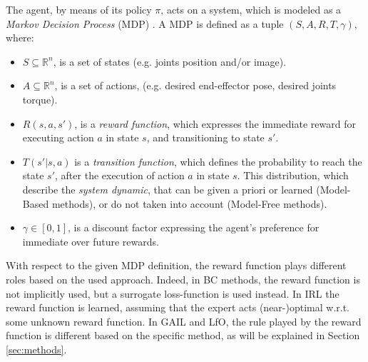 \newline The agent, by means of its policy $\pi$, acts on a system, which is modeled as a \textit{Markov Decision Process} (MDP) \cite{kroemer2021review_robot_learning}. A MDP is defined as a tuple $(S,A,R,T,\gamma)$, where:
\begin{itemize}
    \item $S \subseteq \mathbb{R}^{n}$, is a set of states (e.g. joints position and/or image).
    \item $A \subseteq \mathbb{R}^{n}$, is a set of actions, (e.g. desired end-effector pose, desired joints torque).
    \item $R(s,a,s')$, is a \textit{reward function}, which expresses the immediate reward for executing action $a$ in state $s$, and transitioning to state $s'$.
    \item $T(s'|s,a)$ is a \textit{transition function}, which defines the probability to reach the state $s'$, after the execution of action $a$ in state $s$. This distribution, which describe the \textit{system dynamic}, that can be given a priori or learned (Model-Based methods), or do not taken into account (Model-Free methods).
    \item $\gamma \in [0,1]$, is a discount factor expressing the agent's preference for immediate over future rewards.
\end{itemize}
With respect to the given MDP definition, the reward function plays different roles based on the used approach. Indeed, in BC methods, the reward function is not implicitly used, but a surrogate loss-function is used instead. In IRL the reward function is learned, assuming that the expert acts (near-)optimal w.r.t. some unknown reward function. In GAIL and LfO, the rule played by the reward function is different based on the specific method, as will be explained in Section \ref{sec:methods}.